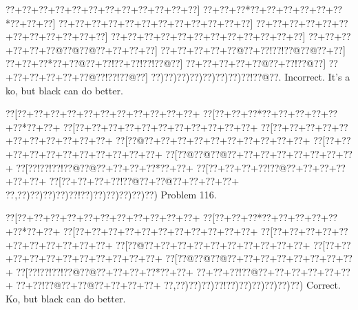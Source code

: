 \documentclass[a5paper]{article}
\begin{document}
\begin{center}
{\goo
\0??+\0??+\0??+\0??+\0??+\0??+\0??+\0??+\0??+\0??+\0??+\0??]
\0??+\0??+\0??*\0??+\0??+\0??+\0??+\0??+\0??*\0??+\0??+\0??]
\0??+\0??+\0??+\0??+\0??+\0??+\0??+\0??+\0??+\0??+\0??+\0??]
\0??+\0??+\0??+\0??+\0??+\0??+\0??+\0??+\0??+\0??+\0??+\0??]
\0??+\0??+\0??+\0??+\0??+\0??+\0??+\0??+\0??+\0??+\0??+\0??]
\0??+\0??+\0??+\0??+\0??+\0??@\0??@\0??@\0??+\0??+\0??+\0??]
\0??+\0??+\0??+\0??+\0??@\0??+\0??!\0??!\0??@\0??@\0??+\0??]
\0??+\0??+\0??*\0??+\0??@\0??+\0??!\0??+\0??!\0??!\0??@\0??]
\0??+\0??+\0??+\0??+\0??@\0??+\0??!\0??@\0??]
\0??+\0??+\0??+\0??+\0??+\0??@\0??!\0??!\0??@\0??]
\0??)\0??)\0??)\0??)\0??)\0??)\0??)\0??!\0??@\0??.
}
Incorrect. It's a ko, but black can do better.

\end{center}
\newpage
\begin{center}
{\goo
\0??[\0??+\0??+\0??+\0??+\0??+\0??+\0??+\0??+\0??+\0??+\0??+
\0??[\0??+\0??+\0??*\0??+\0??+\0??+\0??+\0??+\0??*\0??+\0??+
\0??[\0??+\0??+\0??+\0??+\0??+\0??+\0??+\0??+\0??+\0??+\0??+
\0??[\0??+\0??+\0??+\0??+\0??+\0??+\0??+\0??+\0??+\0??+\0??+
\0??[\0??@\0??+\0??+\0??+\0??+\0??+\0??+\0??+\0??+\0??+\0??+
\0??[\0??+\0??+\0??+\0??+\0??+\0??+\0??+\0??+\0??+\0??+\0??+
\0??[\0??@\0??@\0??@\0??+\0??+\0??+\0??+\0??+\0??+\0??+\0??+
\0??[\0??!\0??!\0??!\0??@\0??@\0??+\0??+\0??+\0??*\0??+\0??+
\0??[\0??+\0??+\0??+\0??!\0??@\0??+\0??+\0??+\0??+\0??+\0??+
\0??[\0??+\0??+\0??+\0??!\0??@\0??+\0??@\0??+\0??+\0??+\0??+
\0??,\0??)\0??)\0??)\0??)\0??!\0??)\0??)\0??)\0??)\0??)\0??)
}
Problem 116.

\end{center}
\begin{center}
{\goo
\0??[\0??+\0??+\0??+\0??+\0??+\0??+\0??+\0??+\0??+\0??+\0??+
\0??[\0??+\0??+\0??*\0??+\0??+\0??+\0??+\0??+\0??*\0??+\0??+
\0??[\0??+\0??+\0??+\0??+\0??+\0??+\0??+\0??+\0??+\0??+\0??+
\0??[\0??+\0??+\0??+\0??+\0??+\0??+\0??+\0??+\0??+\0??+\0??+
\0??[\0??@\0??+\0??+\0??+\0??+\0??+\0??+\0??+\0??+\0??+\0??+
\0??[\0??+\0??+\0??+\0??+\0??+\0??+\0??+\0??+\0??+\0??+\0??+
\0??[\0??@\0??@\0??@\0??+\0??+\0??+\0??+\0??+\0??+\0??+\0??+
\0??[\0??!\0??!\0??!\0??@\0??@\0??+\0??+\0??+\0??*\0??+\0??+
\0??+\0??+\0??!\0??@\0??+\0??+\0??+\0??+\0??+\0??+
\0??+\0??!\0??@\0??+\0??@\0??+\0??+\0??+\0??+
\0??,\0??)\0??)\0??)\0??!\0??)\0??)\0??)\0??)\0??)\0??)
}
Correct. Ko, but black can do better.

\end{center}
\end{document}
